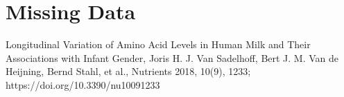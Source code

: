\documentclass[12pt]{article}
\begin{document}
\clearpage

\part{Missing Data}


\newpage



\begin{thebibliography}{1}

 Longitudinal Variation of Amino Acid Levels in Human Milk and Their Associations with Infant Gender, Joris H. J. Van Sadelhoff, Bert J. M. Van de Heijning, Bernd Stahl, et al., Nutrients 2018, 10(9), 1233; https://doi.org/10.3390/nu10091233


\end{thebibliography}
\end{document}

